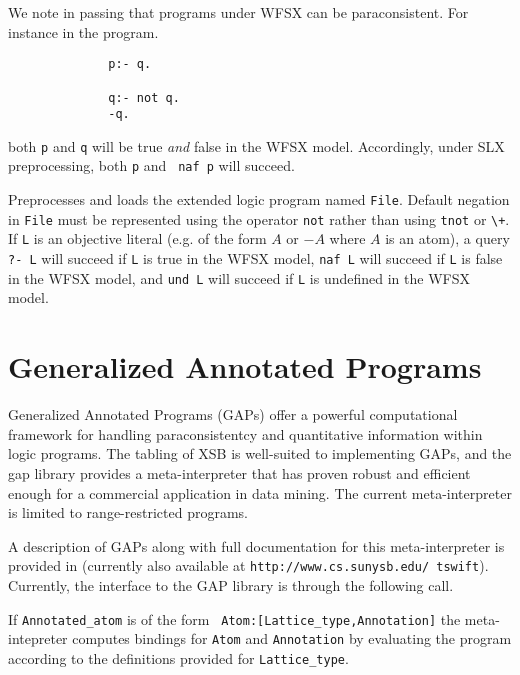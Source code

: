 We note in passing that programs under WFSX can be paraconsistent.
For instance in the program.
{\small
\begin{verbatim}
              p:- q.

              q:- not q.
              -q.
\end{verbatim}
}
both {\tt p} and {\tt q} will be true {\em and} false in the WFSX
model.  Accordingly, under SLX preprocessing, both {\tt p} and {\tt
naf p} will succeed.

\begin{description}
Preprocesses and loads the extended logic program named {\tt File}.
Default negation in {\tt File} must be represented using the operator
{\tt not} rather than using {\tt tnot} or \verb|\+|.  If {\tt L} is an
objective literal (e.g. of the form $A$ or $-A$ where $A$ is an atom),
a query {\tt ?- L} will succeed if {\tt L} is true in the WFSX model,
{\tt naf L} will succeed if {\tt L} is false in the WFSX model, and
{\tt und L} will succeed if {\tt L} is undefined in the WFSX model.
\end{description}


\section{Generalized Annotated Programs}  \label{library_utilities:gap}

Generalized Annotated Programs (GAPs) \cite{KiSu92} offer a powerful
computational framework for handling paraconsistentcy and quantitative
information within logic programs.  The tabling of XSB is well-suited
to implementing GAPs, and the gap library provides a meta-interpreter
that has proven robust and efficient enough for a commercial
application in data mining.  The current meta-interpreter is limited
to range-restricted programs.

A description of GAPs along with full documentation for this
meta-interpreter is provided in \cite{Swif99a} (currently also
available at {\tt http://www.cs.sunysb.edu/~tswift}).  Currently, the
interface to the GAP library is through the following call.

\begin{description}
%
If {\tt Annotated\_atom} is of the form {\tt
Atom:[Lattice\_type,Annotation]} the meta-intepreter computes bindings
for {\tt Atom} and {\tt Annotation} by evaluating the program
according to the definitions provided for {\tt Lattice\_type}.
\end{description}

